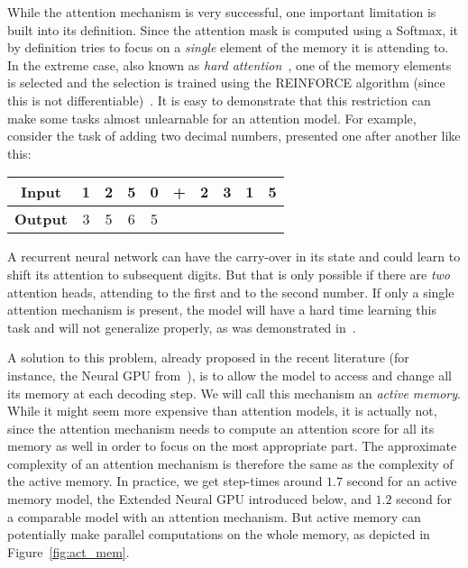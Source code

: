 \documentclass{article}
\begin{document}
While the attention mechanism is very successful, one important
limitation is built into its definition. Since the attention mask
is computed using a Softmax, it by definition tries to focus on
a \emph{single} element of the memory it is attending to. In the
extreme case, also known as {\em hard attention}~\cite{xuetal2015},
one of the memory elements is selected and the selection is trained
using the REINFORCE algorithm  (since this is not differentiable)~\cite{reinforce}.
It is easy to demonstrate that this restriction can make some
tasks almost unlearnable for an attention model. For example,
consider the task of adding two decimal numbers, presented one
after another like this:

\begin{center}
\begin{tabular}{|c||c|c|c|c|c|c|c|c|c|}
\hline
{\bf Input}  & 1 & 2 & 5 & 0 & + & 2 & 3 & 1 & 5 \\ \hline
{\bf Output} & 3 & 5 & 6 & 5 &   &   &   &   &   \\ \hline
\end{tabular}
\end{center}

A recurrent neural network can have the carry-over in its state
and could learn to shift its attention to subsequent digits.
But that is only possible if there are \emph{two} attention heads,
attending to the first and to the second number. If only a single
attention mechanism is present, the model will have a hard time
learning this task and will not generalize properly, as was
demonstrated in~\cite{neural_gpu, stack_rnn}.

A solution to this problem, already proposed in the recent
literature (for instance, the Neural GPU from~\cite{neural_gpu}),
is to allow the model to access and change
all its memory at each decoding step. We will call this mechanism
an {\em active memory}. While it might seem more expensive
than attention models, it is actually not, since
the attention mechanism needs to compute an attention score for all its memory as well
in order to focus on the most appropriate part. The approximate
complexity of an attention mechanism is therefore the same as
the complexity of the active memory. In practice, we get
step-times around $1.7$ second for an active memory model,
the Extended Neural GPU introduced below, and $1.2$ second
for a comparable model with an attention mechanism.
But active memory can potentially make parallel computations
on the whole memory, as depicted in Figure~\ref{fig:act_mem}.
\end{document}
